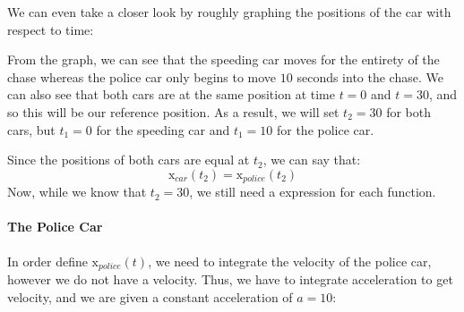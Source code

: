 \documentclass{article}
\newcommand{\x}{\mathrm{x}}
\begin{document}
	We can even take a closer look by roughly graphing the positions of the car with 
	respect to time:
	\begin{center}
	\end{center}

	From the graph, we can see that the speeding car moves for the entirety of the chase whereas
	the police car only begins to move $10$ seconds into the chase. We can also see that both cars 
	are at the same position at time $t=0$ and $t=30$, and so this will be our reference position. 
	As a result, we will set $t_2=30$ for both cars, but $t_1=0$ for the speeding car and $t_1=10$
	for the police car.
	
	Since the positions of both cars are equal at $t_2$, we can say that:
	\[\x_{car}(t_2) = \x_{police}(t_2) \]
	Now, while we know that $t_2=30$, we still need a expression for each function.

	\paragraph{The Police Car} In order define $\x_{police}(t)$, we need to integrate the velocity
	of the police car, however we do not have a velocity. Thus, we have to integrate acceleration to 
	get velocity, and we are given a constant acceleration of $a=10$:
\end{document}
